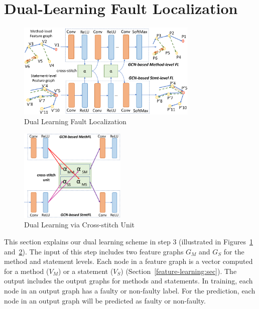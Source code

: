 \section{Dual-Learning Fault Localization}
\label{sec:dual-learning}

\begin{figure}[t]
	\centering
	\includegraphics[width=3.4in]{graphs/dual-learning.png}
        \vspace{-18pt}
	\caption{Dual Learning Fault Localization}
	\label{dual-learning}
\end{figure}

\begin{figure}[t]
	\centering
	\includegraphics[width=2in]{graphs/cross-stitch.png}
        \vspace{-6pt}
	\caption{Dual Learning via Cross-stitch Unit}
	\label{cross-stitch}
\end{figure}

This section explains our dual learning scheme in step 3 (illustrated
in Figures~\ref{dual-learning} and~\ref{cross-stitch}). The input of
this step includes two feature graphs $G_M$ and $G_S$ for the method
and statement levels. Each node in a feature graph is a vector
computed for a method ($V_M$) or a statement ($V_S$)
(Section~\ref{feature-learning:sec}). The output includes the output
graphs for methods and statements. In training, each node in an output
graph has a faulty or non-faulty label. For the prediction, each node
in an output graph will be predicted as faulty or non-faulty.



